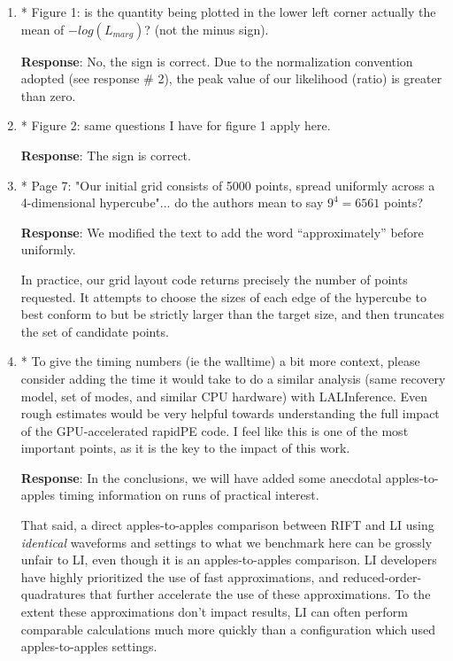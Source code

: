 \documentclass[onecolumn]{revtex4}
\newcommand\editremark[1]{{\color{red} #1}}
\begin{document}
\begin{enumerate}
\item * Figure 1: is the quantity being plotted in the lower left corner
actually the mean of $-log(L_{marg})$? (not the minus sign).

\noindent \textbf{Response}: No, the sign is correct.  Due to the normalization convention adopted (see response \# 2), the peak value
of our likelihood (ratio) is greater than zero.

\item * Figure 2: same questions I have for figure 1 apply here.

\noindent \textbf{Response}: The sign is correct.

\item * Page 7: "Our initial grid consists of 5000 points, spread uniformly
across a 4-dimensional hypercube"... do the authors mean to say $9^4 =
6561$ points?

\noindent \textbf{Response}: We modified the text to add the word ``approximately'' before uniformly.

In practice, our grid layout code returns precisely the number of points requested.  It attempts to choose the sizes of
each edge of the hypercube to best conform to but be strictly larger than the target size, and then truncates the set of
candidate points.  

\item * To give the timing numbers (ie the walltime) a bit more context,
please consider adding the time it would take to do a similar analysis
(same recovery model, set of modes, and similar CPU hardware) with
LALInference. Even rough estimates would be very helpful towards
understanding the full impact of the GPU-accelerated rapidPE code. I
feel like this is one of the most important points, as it is the key
to the impact of this work.

\noindent \textbf{Response}:  In the conclusions, we \editremark{will} have added some anecdotal apples-to-apples timing
information on runs of practical interest.

That said, a direct apples-to-apples comparison between RIFT and LI using \emph{identical} waveforms and settings to
what we benchmark here can be grossly unfair to LI, even though it is an apples-to-apples comparison.  LI developers
have highly prioritized the use of fast approximations, and reduced-order-quadratures that further accelerate the use of
these approximations.     To the extent these approximations don't impact results, LI can often perform comparable
calculations much more quickly than a configuration which used apples-to-apples settings.


\end{enumerate}
\end{document}
